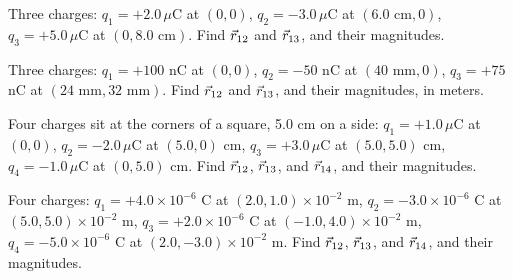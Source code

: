 \documentclass[12pt]{article}
\begin{document}
\prob Three charges: $q_1=+2.0\,\mu\text{C}$ at $(0,0)$, $q_2=-3.0\,\mu\text{C}$ at $(6.0\text{ cm},0)$, $q_3=+5.0\,\mu\text{C}$ at $(0,8.0\text{ cm})$. Find $\vec{r}_{12}$ and $\vec{r}_{13}$, and their magnitudes.

\begin{center}
\end{center}


\prob Three charges: $q_1=+100$ nC at $(0,0)$, $q_2=-50$ nC at $(40\text{ mm},0)$, $q_3=+75$ nC at $(24\text{ mm},32\text{ mm})$. Find $\vec{r}_{12}$ and $\vec{r}_{13}$, and their magnitudes, in meters.


\clearpage

\prob Four charges sit at the corners of a square, 5.0 cm on a side: $q_1=+1.0\,\mu\text{C}$ at $(0,0)$, $q_2=-2.0\,\mu\text{C}$ at $(5.0,0)$ cm, $q_3=+3.0\,\mu\text{C}$ at $(5.0,5.0)$ cm, $q_4=-1.0\,\mu\text{C}$ at $(0,5.0)$ cm. Find $\vec{r}_{12}$, $\vec{r}_{13}$, and $\vec{r}_{14}$, and their magnitudes.

\begin{center}
\end{center}


\prob Four charges: $q_1=+4.0\times10^{-6}$ C at $(2.0,1.0)\times10^{-2}$ m, $q_2=-3.0\times10^{-6}$ C at $(5.0,5.0)\times10^{-2}$ m, $q_3=+2.0\times10^{-6}$ C at $(-1.0,4.0)\times10^{-2}$ m, $q_4=-5.0\times10^{-6}$ C at $(2.0,-3.0)\times10^{-2}$ m. Find $\vec{r}_{12}$, $\vec{r}_{13}$, and $\vec{r}_{14}$, and their magnitudes.
\end{document}
